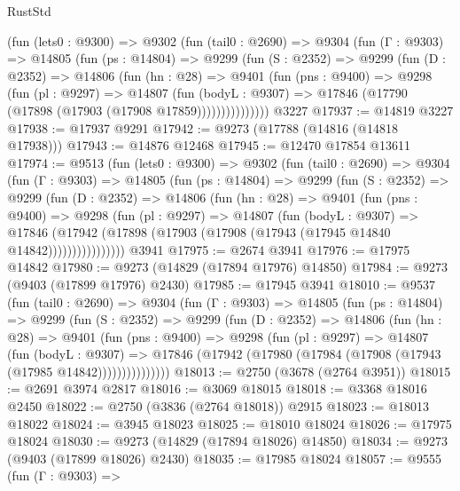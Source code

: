 \begin{lexlean}{RustStd}
\begin{coremodule}
{\begin{coremodule}
{{{{{{{{{{{{{{{{{{{{{{{{{{{{{{{{{{{{{{{{{{{{{{{{{{{{{{{      (fun (lets0 : @9300) =>
      @9302
        (fun (tail0 : @2690) =>
        @9304
          (fun (Γ : @9303) =>
          @14805
            (fun (ps : @14804) =>
            @9299
              (fun (S : @2352) =>
              @9299
                (fun (D : @2352) =>
                @14806
                  (fun (hn : @28) =>
                  @9401
                    (fun (pns : @9400) =>
                    @9298
                      (fun (pl : @9297) =>
                      @14807
                        (fun (bodyL : @9307) =>
                        @17846 (@17790 (@17898 (@17903 (@17908 @17859)))))))))))))))
    @3227
@17937 := @14819 @3227
@17938 := @17937 @9291
@17942 := @9273 (@17788 (@14816 (@14818 @17938)))
@17943 := @14876 @12468
@17945 := @12470 @17854 @13611
@17974 := @9513
    (fun (lets0 : @9300) =>
    @9302
      (fun (tail0 : @2690) =>
      @9304
        (fun (Γ : @9303) =>
        @14805
          (fun (ps : @14804) =>
          @9299
            (fun (S : @2352) =>
            @9299
              (fun (D : @2352) =>
              @14806
                (fun (hn : @28) =>
                @9401
                  (fun (pns : @9400) =>
                  @9298
                    (fun (pl : @9297) =>
                    @14807
                      (fun (bodyL : @9307) =>
                      @17846
                        (@17942
                          (@17898 (@17903 (@17908 (@17943 (@17945 @14840 @14842))))))))))))))))
    @3941
@17975 := @2674 @3941
@17976 := @17975 @14842
@17980 := @9273 (@14829 (@17894 @17976) @14850)
@17984 := @9273 (@9403 (@17899 @17976) @2430)
@17985 := @17945 @3941
@18010 := @9537
    (fun (tail0 : @2690) =>
    @9304
      (fun (Γ : @9303) =>
      @14805
        (fun (ps : @14804) =>
        @9299
          (fun (S : @2352) =>
          @9299
            (fun (D : @2352) =>
            @14806
              (fun (hn : @28) =>
              @9401
                (fun (pns : @9400) =>
                @9298
                  (fun (pl : @9297) =>
                  @14807
                    (fun (bodyL : @9307) =>
                    @17846 (@17942 (@17980 (@17984 (@17908 (@17943 (@17985 @14842)))))))))))))))
@18013 := @2750 (@3678 (@2764 @3951))
@18015 := @2691 @3974 @2817
@18016 := @3069 @18015
@18018 := @3368 @18016 @2450
@18022 := @2750 (@3836 (@2764 @18018)) @2915
@18023 := @18013 @18022
@18024 := @3945 @18023
@18025 := @18010 @18024
@18026 := @17975 @18024
@18030 := @9273 (@14829 (@17894 @18026) @14850)
@18034 := @9273 (@9403 (@17899 @18026) @2430)
@18035 := @17985 @18024
@18057 := @9555
    (fun (Γ : @9303) =>
}}}}}}}}}}}}}}}}}}}}}}}}}}}}}}}}}}}}}}}}}}}}}}}}}}}}}}}
\end{coremodule}}
\end{coremodule}
\end{lexlean}

